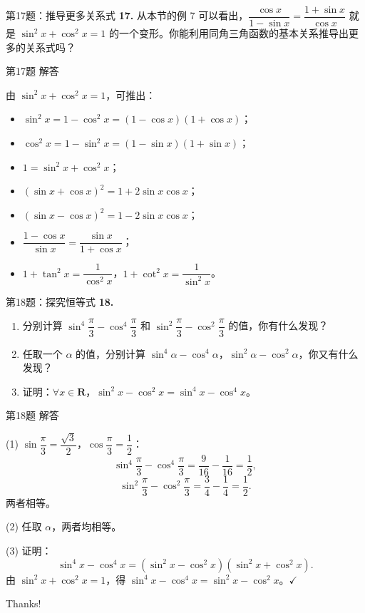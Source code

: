 \documentclass[10pt,aspectratio=169,serif]{beamer}
\begin{document}
\begin{frame}[t]{第17题：推导更多关系式}
\textbf{17.} 从本节的例 7 可以看出，$\dfrac{\cos x}{1-\sin x}=\dfrac{1+\sin x}{\cos x}$ 就是 $\sin^2 x+\cos^2 x=1$ 的一个变形。你能利用同角三角函数的基本关系推导出更多的关系式吗？
\end{frame}

\begin{frame}[t]{第17题 解答}
\begin{tcolorbox}[colback=orange!10,colframe=orange,title=\textbf{参考答案}]
由 $\sin^2 x+\cos^2 x=1$，可推出：
\begin{itemize}
  \item $\sin^2 x = 1-\cos^2 x=(1-\cos x)(1+\cos x)$；
  \item $\cos^2 x = 1-\sin^2 x=(1-\sin x)(1+\sin x)$；
  \item $1 = \sin^2 x+\cos^2 x$；
  \item $(\sin x+\cos x)^2 = 1+2\sin x\cos x$；
  \item $(\sin x-\cos x)^2 = 1-2\sin x\cos x$；
  \item $\dfrac{1-\cos x}{\sin x}=\dfrac{\sin x}{1+\cos x}$；
  \item $1+\tan^2 x=\dfrac{1}{\cos^2 x}$，$1+\cot^2 x=\dfrac{1}{\sin^2 x}$。
\end{itemize}
\end{tcolorbox}
\end{frame}

\begin{frame}[t]{第18题：探究恒等式}
\textbf{18.}
\begin{enumerate}
  \item 分别计算 $\sin^4\dfrac{\pi}{3}-\cos^4\dfrac{\pi}{3}$ 和 $\sin^2\dfrac{\pi}{3}-\cos^2\dfrac{\pi}{3}$ 的值，你有什么发现？
  \item 任取一个 $\alpha$ 的值，分别计算 $\sin^4\alpha-\cos^4\alpha$，$\sin^2\alpha-\cos^2\alpha$，你又有什么发现？
  \item 证明：$\forall x\in\mathbf{R}$，$\sin^2 x-\cos^2 x=\sin^4 x-\cos^4 x$。
\end{enumerate}
\end{frame}

\begin{frame}[t]{第18题 解答}
\begin{tcolorbox}[colback=orange!10,colframe=orange,title=\textbf{解}]
(1) $\sin\dfrac{\pi}{3}=\dfrac{\sqrt{3}}{2}$，$\cos\dfrac{\pi}{3}=\dfrac{1}{2}$：
\[
\sin^4\frac{\pi}{3}-\cos^4\frac{\pi}{3}=\frac{9}{16}-\frac{1}{16}=\frac{1}{2},
\]
\[
\sin^2\frac{\pi}{3}-\cos^2\frac{\pi}{3}=\frac{3}{4}-\frac{1}{4}=\frac{1}{2}.
\]
两者相等。

(2) 任取 $\alpha$，两者均相等。

(3) 证明：
\[
\sin^4 x-\cos^4 x=(\sin^2 x-\cos^2 x)(\sin^2 x+\cos^2 x).
\]
由 $\sin^2 x+\cos^2 x=1$，得 $\sin^4 x-\cos^4 x=\sin^2 x-\cos^2 x$。$\checkmark$
\end{tcolorbox}
\end{frame}

\begin{frame}[c]
  \begin{center}
    {\Huge\calligra Thanks!}
  \end{center}
\end{frame}
\end{document}
